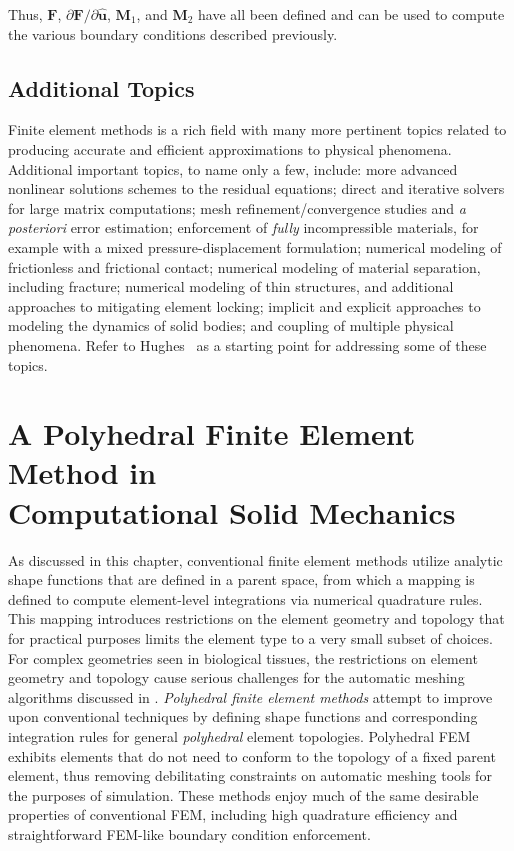 Thus, $\bm{F}$, ${\partial \bm{F}}/{\partial \hat{\bm{u}}}$, $\bm{M}_1$, and $\bm{M}_2$ have all been defined and can be used to compute the various boundary conditions described previously.

\subsection{Additional Topics}
Finite element methods is a rich field with many more pertinent topics related to producing accurate and efficient approximations to physical phenomena. Additional important topics, to name only a few, include: more advanced nonlinear solutions schemes to the residual equations; direct and iterative solvers for large matrix computations; mesh refinement/convergence studies and \textit{a posteriori} error estimation; 
enforcement of \textit{fully} incompressible materials, for example with a mixed pressure-displacement formulation; numerical modeling of frictionless and frictional contact; numerical modeling of material separation, including fracture; numerical modeling of thin structures, and additional approaches to mitigating element locking; implicit and explicit approaches to modeling the dynamics of solid bodies; and coupling of multiple physical phenomena. Refer to Hughes~\cite{hughes_2000} as a starting point for addressing some of these topics.

\section[A Polyhedral Finite Element Method in Computational Solid \\ Mechanics]{\texorpdfstring{A Polyhedral Finite Element Method in \\ Computational Solid Mechanics}{A Polyhedral Finite Element Method in Computational Solid \\ Mechanics}}
\label{A Polyhedral Finite Element Method in Computational Solid Mechanics}

As discussed in this chapter, conventional finite element methods utilize analytic shape functions that are defined in a parent space, from which a mapping is defined to compute element-level integrations via numerical quadrature rules. This mapping introduces restrictions on the element geometry and topology that for practical purposes limits the element type to a very small subset of choices. For complex geometries seen in biological tissues, the restrictions on element geometry and topology cause serious challenges for the automatic meshing algorithms discussed in . \textit{Polyhedral finite element methods} attempt to improve upon conventional techniques by defining shape functions and corresponding integration rules for general  \textit{polyhedral} element topologies. Polyhedral FEM exhibits elements that do not need to conform to the topology of a fixed parent element, thus removing debilitating constraints on automatic meshing tools for the purposes of simulation. These methods enjoy much of the same desirable properties of conventional FEM, including high quadrature efficiency and straightforward FEM-like boundary condition enforcement.

